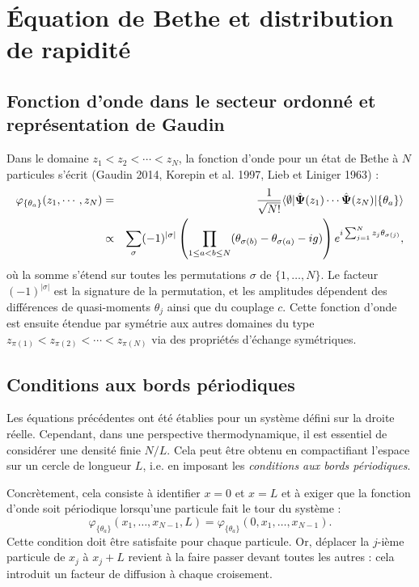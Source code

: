 \section{Équation de Bethe et distribution de rapidité}

\subsection{Fonction d’onde dans le secteur ordonné et représentation de Gaudin}

Dans le domaine $z_1 < z_2 < \cdots < z_N$, la fonction d’onde pour un état de Bethe à $N$ particules s’écrit ({\color{blue}Gaudin 2014}, {\color{blue}Korepin et al. 1997}, {\color{black}Lieb et Liniger 1963}) :
\begin{eqnarray}
	\varphi_{\{\theta_a\}} ( z_1 , \cdots , z_N ) & = &  \frac{1}{\sqrt{N!}}\langle \emptyset \vert \hat{\bm{\Psi}} ( z_1 ) \cdots \hat{\bm{\Psi}} (z_N ) \vert \{ \theta_a \} \rangle \notag\\
	& \propto & \sum_\sigma (-1)^{|\sigma|} \left( \prod_{1 \leq a < b \leq N} (\theta_{\sigma(b)} - \theta_{\sigma(a)} - i g) \right) e^{i \sum_{j=1}^{N} z_j \theta_{\sigma(j)}},\label{eq:I-2-17}
\end{eqnarray}
où la somme s'étend sur toutes les permutations $\sigma$ de $\{1,\dots,N\}$. Le facteur $(-1)^{|\sigma|}$ est la signature de la permutation, et les amplitudes dépendent des différences de quasi-moments $\theta_j$ ainsi que du couplage $c$.
Cette fonction d’onde est ensuite étendue par symétrie aux autres domaines du type $z_{\pi(1)} < z_{\pi(2)} < \cdots < z_{\pi(N)}$ via des propriétés d’échange symétriques.

\vspace{1em}

\subsection{Conditions aux bords périodiques}

Les équations précédentes ont été établies pour un système défini sur la droite réelle. Cependant, dans une perspective thermodynamique, il est essentiel de considérer une densité finie $ N/L$. Cela peut être obtenu en compactifiant l’espace sur un cercle de longueur $L$, i.e. en imposant les {\em conditions aux bords périodiques}.

Concrètement, cela consiste à identifier $x = 0$ et $x = L$ et à exiger que la fonction d’onde soit périodique lorsqu’une particule fait le tour du système :
\begin{equation}\label{eq:periodic}
\varphi_{\{\theta_a\}}(x_1, \dots, x_{N-1}, L) = \varphi_{\{\theta_a\}}(0, x_1, \dots, x_{N-1}).
\end{equation}
Cette condition doit être satisfaite pour chaque particule. Or, déplacer la $j$-ième particule de $x_j$ à $x_j + L$ revient à la faire passer devant toutes les autres : cela introduit un facteur de diffusion à chaque croisement.

